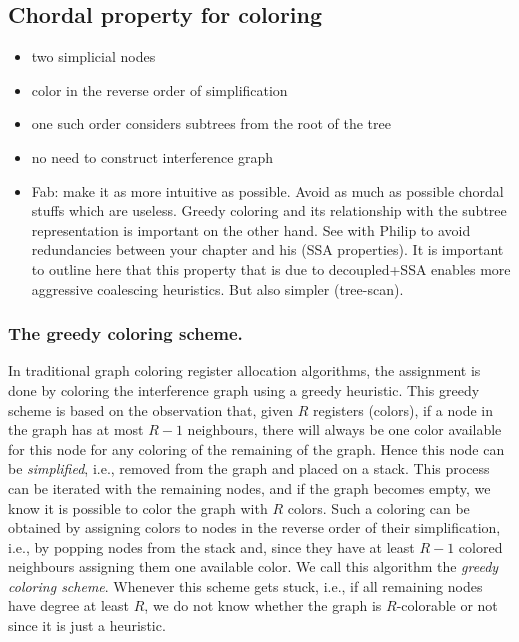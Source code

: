 {\subsection{Chordal property for coloring}

{\sl
\begin{itemize}
  \item two simplicial nodes
  \item color in the reverse order of simplification
  \item one such order considers subtrees from the root of the tree
  \item no need to construct interference graph
  \item Fab: make it as more intuitive as possible. Avoid as much as possible 
    chordal stuffs which are useless. Greedy coloring and its relationship with 
    the subtree representation is important on the other hand. See with Philip 
    to avoid redundancies between your chapter and his (SSA properties). It is 
    important to outline here that this property that is due to decoupled+SSA 
    enables more aggressive coalescing heuristics. But also simpler 
    (tree-scan).
\end{itemize}
}

\subsubsection{The greedy coloring scheme.}

In traditional graph coloring register allocation algorithms, the assignment is 
done by coloring the interference graph using a greedy heuristic. This greedy 
scheme is based on the observation that, given $R$ registers (colors), if a 
node in the graph has at most $R-1$ neighbours, there will always be one color 
available for this node for any coloring of the remaining of the graph. Hence 
this node can be \emph{simplified}, i.e., removed from the graph and placed on 
a stack. This process can be iterated with the remaining nodes, and if the 
graph becomes empty, we know it is possible to color the graph with $R$ colors. 
Such a coloring can be obtained by assigning colors to nodes in the reverse 
order of their simplification, i.e., by popping nodes from the stack and, since 
they have at least $R-1$ colored neighbours assigning them one available color. 
We call this algorithm the \emph{greedy coloring scheme}. Whenever this scheme 
gets stuck, i.e., if all remaining nodes have degree at least $R$, we do not 
know whether the graph is $R$-colorable or not since it is just a heuristic.


}
